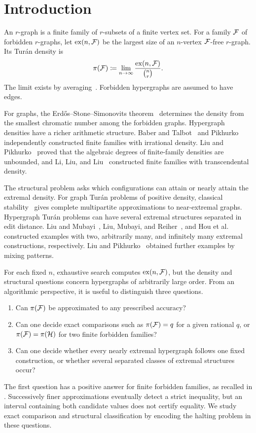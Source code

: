 \documentclass[10pt]{article}
\numberwithin{equation}{section}
\theoremstyle{definition}
\newcommand{\ex}{\operatorname{ex}}\newcommand{\supp}{\operatorname{supp}}
\begin{document}
\tableofcontents

\section{Introduction}\label{sec:intro}
An $r$-graph is a finite family of $r$-subsets of a finite vertex set. For a family $\mathcal F$ of forbidden $r$-graphs, let $\ex(n,\cF)$ be the largest size of an $n$-vertex $\mathcal F$-free $r$-graph. Its Tur\'an density is
\[
 \pi(\cF)\coloneqq\lim_{n\to\infty}\frac{\ex(n,\cF)}{\binom nr}.
\]
The limit exists by averaging~\cite{KatonaNemetzSimonovits1964}. Forbidden hypergraphs are assumed to have edges.

For graphs, the Erd\H{o}s--Stone--Simonovits theorem~\cite{ErdosStone1946,ErdosSimonovits1966} determines the density from the smallest chromatic number among the forbidden graphs. Hypergraph densities have a richer arithmetic structure. Baber and Talbot~\cite{BaberTalbot2012} and Pikhurko~\cite{Pikhurko2014} independently constructed finite families with irrational density. Liu and Pikhurko~\cite{LiuPikhurko2023} proved that the algebraic degrees of finite-family densities are unbounded, and Li, Liu, and Liu~\cite{LiLiuLiu2026} constructed finite families with transcendental density.

The structural problem asks which configurations can attain or nearly attain the extremal density. For graph Tur\'an problems of positive density, classical stability~\cite{Erdos1967Stability,Simonovits1968Stability} gives complete multipartite approximations to near-extremal graphs. Hypergraph Tur\'an problems can have several extremal structures separated in edit distance. Liu and Mubayi~\cite{LiuMubayi2022}, Liu, Mubayi, and Reiher~\cite{LiuMubayiReiher2026}, and Hou et al.~\cite{HouEtAl2023} constructed examples with two, arbitrarily many, and infinitely many extremal constructions, respectively. Liu and Pikhurko~\cite{LiuPikhurko2025} obtained further examples by mixing patterns.

For each fixed $n$, exhaustive search computes $\ex(n,\cF)$, but the density and structural questions concern hypergraphs of arbitrarily large order. From an algorithmic perspective, it is useful to distinguish three questions.
\begin{enumerate}
\item Can $\pi(\mathcal F)$ be approximated to any prescribed accuracy?
\item Can one decide exact comparisons such as $\pi(\mathcal F)=q$ for a given rational $q$, or $\pi(\mathcal F)=\pi(\mathcal H)$ for two finite forbidden families?
\item Can one decide whether every nearly extremal hypergraph follows one fixed construction, or whether several separated classes of extremal structures occur?
\end{enumerate}
The first question has a positive answer for finite forbidden families, as recalled in . Successively finer approximations eventually detect a strict inequality, but an interval containing both candidate values does not certify equality. We study exact comparison and structural classification by encoding the halting problem in these questions.
\end{document}
